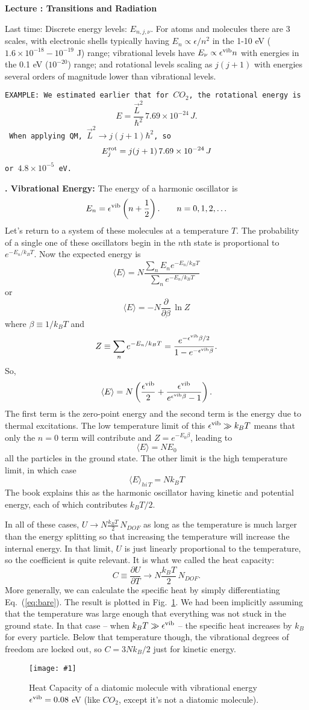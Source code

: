 \documentclass[11pt]{book}
\def\be{\begin{equation}}
\def\ee{\end{equation}}
\newcommand{\ec}[1]{Eq.~(\ref{eq:#1})}
\newcommand{\eql}[1]{\label{eq:#1}}
\newcommand{\sfig}[2]{
\texttt{[image: \#1]}
        }
\newcommand{\Spng}[2]{
   \begin{figure}[thbp]
   \begin{center}
    \sfig{../Figures/#1.png}{0.7\columnwidth}
    \caption{{\small #2}}
    \label{fig:#1}
     \end{center}
   \end{figure}
}
\newcommand{\rf}[1]{\ref{fig:#1}}
\newcommand\example[1]{{\tt EXAMPLE: #1}}
\newcommand\lecture[1]{\newpage
\addtocounter{lectureno}{1}
\setcounter{secno}{0}
\begin{center}
 {\bf Lecture \arabic{lectureno}: #1}
\end{center}
}
\newcounter{lectureno}
\newcounter{secno}
\newcommand\lsection[1]{
\addtocounter{secno}{1}
{\bf \arabic{lectureno}.\alph{secno} #1:}}
\begin{document}
\lecture{Transitions and Radiation}
Last time: Discrete energy levels: $E_{n,j,\nu}$. For atoms and molecules there are 3 scales, with electronic shells typically having $E_n\propto \epsilon/n^2$ in the 1-10 eV ($1.6\times 10^{-18}-10^{-19}$ J) range; vibrational levels have $E_\nu\propto \epsilon^{\rm vib} n$ with energies in the 0.1 eV ($10^{-20}$) range; and rotational levels scaling as $j(j+1)$ with energies several orders of magnitude lower than vibrational levels.

\example{We estimated earlier that for $CO_2$, the rotational energy is
\be
E = \frac{\vec L^2}{\hbar^2} \,7.69\times 10^{-24}\, J
.\ee
When applying QM, $\vec L^2\rightarrow j(j+1)\hbar^2$, so
\be E_{j}^{\rm rot} = j(j+1) \,7.69\times 10^{-24}\, J \eql{co2rot}
\ee or $4.8\times 10^{-5}$ eV.}


\lsection{Vibrational Energy}
The energy of a harmonic oscillator is
\be
E_n=\evib\left(n+\frac12 \right).\qquad n=0,1,2,\ldots\ee
Let's return to a system of these molecules at a temperature $T$. The probability of a single one of these oscillators begin in the $n$th state is proportional to $e^{-E_n/k_BT}$. Now the expected energy is
\be
\langle E\rangle
= N\frac{\sum_n E_n e^{-E_n/k_BT}}{\sum_n e^{-E_n/k_BT}}
\ee
or
\be
\langle E\rangle = -N\frac{\partial}{\partial\beta} \,\ln Z
\ee
where $\beta\equiv 1/k_BT$ and
\be
Z\equiv \sum_ne^{-E_n/k_BT}=\frac{e^{-\evib\beta/2}}{1-e^{-\evib\beta}}.\ee
So,
\be
\langle E\rangle = N\left( \frac{\evib}{2} + \frac{\evib}{e^{\evib\beta}-1} \right).\eql{bare}\ee
The first term is the zero-point energy and the second term is the energy due to thermal excitations.
The low temperature limit of this $\epsilon^{\rm vib} \gg k_BT$ means that only the $n=0$ term will contribute and $Z=e^{-E_0\beta}$, leading to
\be
\langle E\rangle = NE_0\ee
all the particles in the ground state. The other limit is the high temperature limit, in which case \be
\langle E\rangle_{hi\, T} =Nk_BT\ee
The book explains this as the harmonic oscillator having kinetic and potential energy, each of which contributes $k_BT/2$.

In all of these cases, $U\rightarrow N\frac{k_BT}2\,N_{DOF}$ as long as the temperature is much larger than the energy splitting so that increasing the temperature will increase the internal energy. In that limit, $U$ is just linearly proportional to the temperature, so the coefficient is quite relevant. It is what we called the heat capacity:
\be
C \equiv \frac{\partial U}{\partial T} \rightarrow  N\frac{k_BT}2\,N_{DOF}.\ee
More generally, we can %
calculate the specific heat by simply differentiating \ec{bare}. The result is plotted in Fig.~\rf{sh}. We had been implicitly assuming that the temperature was large enough that everything was not stuck in the ground state. In that case -- when $k_BT\gg \epsilon^{\rm vib}$ -- the specific heat increases by $k_B$ for every particle. Below that temperature though, the vibrational degrees of freedom are locked out, so $C=3Nk_B/2$ just for kinetic energy. 
\Spng{sh}{Heat Capacity of a diatomic molecule with vibrational energy $\epsilon^{\rm vib}=0.08$ eV (like $CO_2$, except it's not a diatomic molecule).}
\end{document}
